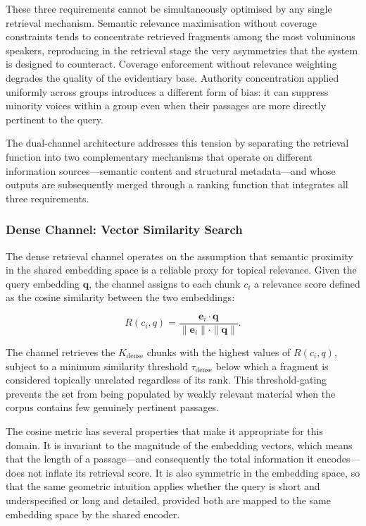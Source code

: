 These three requirements cannot be simultaneously optimised by any single retrieval mechanism.
Semantic relevance maximisation without coverage constraints tends to concentrate retrieved
fragments among the most voluminous speakers, reproducing in the retrieval stage the very
asymmetries that the system is designed to counteract. Coverage enforcement without relevance
weighting degrades the quality of the evidentiary base. Authority concentration applied
uniformly across groups introduces a different form of bias: it can suppress minority voices
within a group even when their passages are more directly pertinent to the query.

The dual-channel architecture addresses this tension by separating the retrieval function into
two complementary mechanisms that operate on different information sources---semantic content
and structural metadata---and whose outputs are subsequently merged through a ranking function
that integrates all three requirements.

\subsubsection{Dense Channel: Vector Similarity Search}

The dense retrieval channel operates on the assumption that semantic proximity in the shared
embedding space is a reliable proxy for topical relevance. Given the query embedding
$\mathbf{q}$, the channel assigns to each chunk $c_i$ a relevance score defined as the cosine
similarity between the two embeddings:

\begin{equation}
    R(c_i, q) = \frac{\mathbf{e}_i \cdot \mathbf{q}}{\|\mathbf{e}_i\| \cdot \|\mathbf{q}\|}.
\end{equation}

The channel retrieves the $K_\text{dense}$ chunks with the highest values of $R(c_i, q)$,
subject to a minimum similarity threshold $\tau_\text{dense}$ below which a fragment is
considered topically unrelated regardless of its rank. This threshold-gating prevents the set
from being populated by weakly relevant material when the corpus contains few genuinely pertinent
passages.

The cosine metric has several properties that make it appropriate for this domain. It is
invariant to the magnitude of the embedding vectors, which means that the length of a passage---and
consequently the total information it encodes---does not inflate its retrieval score. It is
also symmetric in the embedding space, so that the same geometric intuition applies whether the
query is short and underspecified or long and detailed, provided both are mapped to the same
embedding space by the shared encoder.

